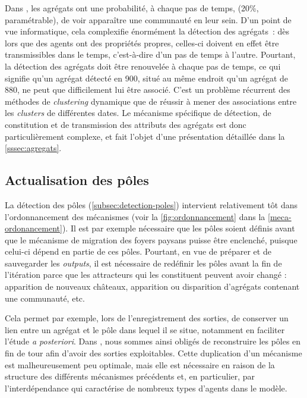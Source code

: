 \begin{tcolorbox}[breakable,left=0pt,right=0pt,top=0pt,bottom=0pt,
	colback=gray!15,colframe=gray!15,width=\dimexpr\textwidth\relax, 
	enlarge left by=0mm, boxsep=5pt,arc=0pt,outer arc=0pt]
	
Dans \simfeodal{}, les agrégats ont une probabilité, à chaque pas de temps, (20\%, paramétrable), de voir apparaître une communauté en leur sein.
D'un point de vue informatique, cela complexifie énormément la détection des agrégats :
	dès lors que des agents ont des propriétés propres, celles-ci doivent en effet être transmissibles dans le temps, c'est-à-dire d'un pas de temps à l'autre.
Pourtant, la détection des agrégats doit être renouvelée à chaque pas de temps, ce qui signifie qu'un agrégat détecté en 900, situé au même endroit qu'un agrégat de 880, ne peut que difficilement lui être associé.
C'est un problème récurrent des méthodes de \textit{clustering} dynamique que de réussir à mener des associations entre les \textit{clusters} de différentes dates.
Le mécanisme spécifique de détection, de constitution et de transmission des attributs des agrégats est donc particulièrement complexe, et fait l'objet d'une présentation détaillée dans la \cref{sssec:agregats}.
\end{tcolorbox}

\subsection{Actualisation des pôles}

\begin{tcolorbox}[breakable,left=0pt,right=0pt,top=0pt,bottom=0pt,
	colback=gray!15,colframe=gray!15,width=\dimexpr\textwidth\relax, 
	enlarge left by=0mm, boxsep=5pt,arc=0pt,outer arc=0pt,parbox=false]

La détection des pôles (\cref{subsec:detection-poles}) intervient relativement tôt dans l'ordonnancement des mécanismes (voir la \cref{fig:ordonnancement} dans la \cref{meca-ordonancement}).
Il est par exemple nécessaire que les pôles soient définis avant que le mécanisme de migration des foyers paysans puisse être enclenché, puisque celui-ci dépend en partie de ces pôles.
Pourtant, en vue de préparer et de sauvegarder les \textit{outputs}, il est nécessaire de redéfinir les pôles avant la fin de l'itération parce que les attracteurs qui les constituent peuvent avoir changé :
	apparition de nouveaux châteaux, apparition ou disparition d'agrégats contenant une communauté, etc.

Cela permet par exemple, lors de l'enregistrement des sorties, de conserver un lien entre un agrégat et le pôle dans lequel il se situe, notamment en faciliter l'étude \textit{a posteriori}.
Dans \simfeodal{}, nous sommes ainsi obligés de reconstruire les pôles en fin de tour afin d'avoir des sorties exploitables.
Cette duplication d'un mécanisme est malheureusement peu optimale, mais elle est nécessaire en raison de la structure des différents mécanismes précédents et, en particulier, par l'interdépendance qui caractérise de nombreux types d'agents dans le modèle.
\end{tcolorbox}


